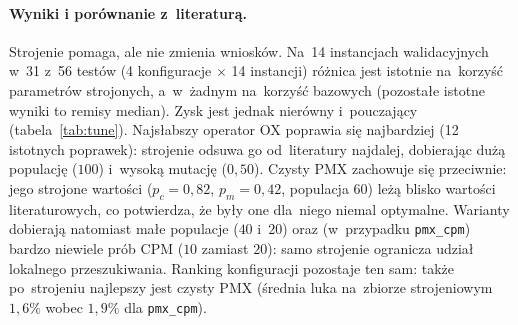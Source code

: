 \documentclass[pdflatex,sn-mathphys,Numbered]{sn-jnl}
\begin{document}
\paragraph{Wyniki i porównanie z~literaturą.} Strojenie pomaga, ale nie zmienia
wniosków. Na~14 instancjach walidacyjnych w~31 z~56 testów (4 konfiguracje
$\times$ 14 instancji) różnica jest istotnie na~korzyść parametrów strojonych,
a~w~żadnym na~korzyść bazowych (pozostałe istotne wyniki to remisy median). Zysk
jest jednak nierówny i~pouczający (tabela~\ref{tab:tune}). Najsłabszy operator OX
poprawia się najbardziej (12 istotnych poprawek): strojenie odsuwa go od~literatury
najdalej, dobierając dużą populację ($100$) i~wysoką mutację ($0{,}50$). Czysty PMX
zachowuje się przeciwnie: jego strojone wartości ($p_c=0{,}82$, $p_m=0{,}42$, populacja $60$)
leżą blisko wartości literaturowych, co potwierdza, że były one dla~niego niemal
optymalne. Warianty dobierają natomiast małe populacje ($40$ i~$20$)
oraz (w~przypadku \texttt{pmx\_cpm}) bardzo niewiele prób CPM ($10$ zamiast
$20$): samo strojenie ogranicza udział lokalnego przeszukiwania. Ranking
konfiguracji pozostaje ten sam: także po~strojeniu najlepszy jest czysty PMX
(średnia luka na~zbiorze strojeniowym $1{,}6\%$ wobec $1{,}9\%$ dla
\texttt{pmx\_cpm}).

\end{document}
